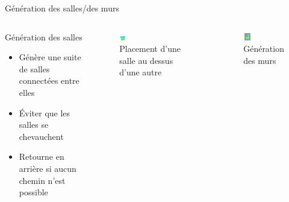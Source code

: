 \documentclass{beamer}
\begin{document}
{\begin{frame}{Génération des salles/des murs}
    \begin{columns}
        \begin{block}{Génération des salles}
            \begin{itemize}
                \item[\bullet] Génère une suite de salles connectées entre elles
                \item[\bullet] Éviter que les salles se chevauchent
                \item[\bullet] Retourne en arrière si aucun chemin n'est possible
            \end{itemize}
        \end{block}
        \begin{figure}
            \centering
            \includegraphics[height=0.2\textheight]{images/room_placement}
            \caption{Placement d'une salle au dessus d'une autre}
        \end{figure}
        \begin{figure}
            \centering
            \includegraphics[height=0.2\textheight]{images/filling_the_world}
            \caption{Génération des murs}
        \end{figure}
    \end{columns}
\end{frame}

}
\end{document}
